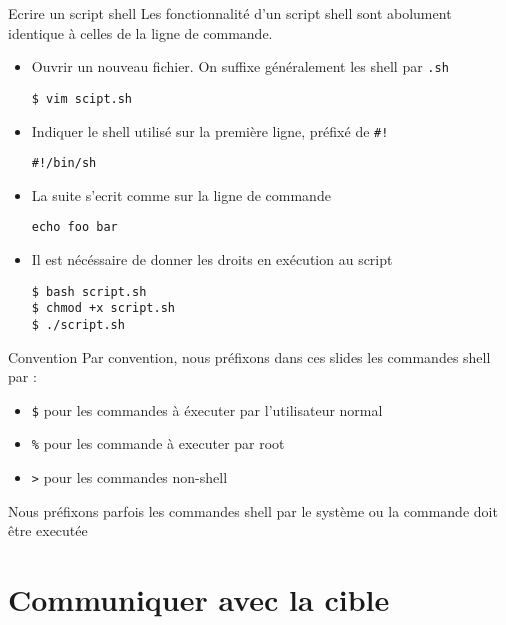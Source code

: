 \begin{frame}[fragile=singleslide]{Ecrire un script shell}
  Les  fonctionnalité d'un  script  shell sont  abolument identique  à
  celles de la ligne de commande.
  \begin{itemize}
  \item Ouvrir  un nouveau fichier. On suffixe  généralement les shell
    par \verb+.sh+
\begin{lstlisting}
$ vim scipt.sh
\end{lstlisting} %
  \item Indiquer  le shell utilisé  sur la première ligne,  préfixé de
    \verb+#!+
\begin{lstlisting}
#!/bin/sh
\end{lstlisting} %
  \item La suite s'ecrit comme sur la ligne de commande
\begin{lstlisting}
echo foo bar
\end{lstlisting} %
  \item Il est nécéssaire de donner les droits en exécution au script
\begin{lstlisting}
$ bash script.sh
$ chmod +x script.sh
$ ./script.sh
\end{lstlisting} %
  \end{itemize}
\end{frame}

\begin{frame}[fragile=singleslide]{Convention}
  Par convention,  nous préfixons dans ces slides  les commandes shell
  par :
  \begin{itemize}
  \item  \verb+$+  pour les  commandes  à  éxecuter par  l'utilisateur
    normal
  \item \verb+%+ pour les commande à executer par root
  \item \verb+>+ pour les commandes non-shell
  \end{itemize}
  Nous  préfixons parfois  les commandes  shell par  le système  ou la
  commande doit être executée
\end{frame}

\section{Communiquer avec la cible}

